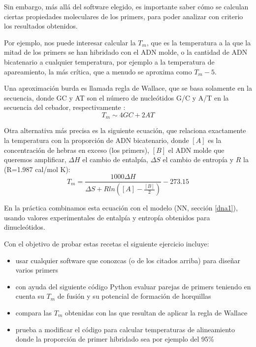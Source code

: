 Sin embargo, m\'{a}s all\'{a} del software elegido, es importante saber c\'{o}mo se calculan ciertas propiedades moleculares de los primers,
para poder analizar con criterio los resultados obtenidos. 

Por ejemplo, nos puede interesar calcular la $T_{m}$, 
que es la temperatura a la que la mitad de los primers se han hibridado con el ADN molde, 
o la cantidad de ADN bicatenario a cualquier temperatura, por ejemplo a la temperatura de apareamiento, 
la m\'{a}s cr\'{i}tica, que a menudo se aproxima como $T_{m} - 5$.

Una aproximaci\'{o}n burda es llamada regla de Wallace, que se basa solamente en la secuencia,
donde GC y AT son el n\'{u}mero de nucle\'{o}tidos G/C y A/T en la secuencia del cebador, respectivamente \citep{SantaLucia2007}:
\begin{equation}
T_{m} \sim 4GC + 2AT
\end{equation}

Otra alternativa m\'{a}s precisa es la siguiente ecuaci\'{o}n, 
que relaciona exactamente la temperatura con la proporci\'{o}n de ADN bicatenario,
donde $[A]$ es la concentraci\'{o}n de hebras en exceso (los primers), $[B]$ el ADN molde que queremos amplificar,
$\Delta H$ el cambio de entalp\'{i}a, $\Delta S$ el cambio de entrop\'{i}a y $R$ la 
 (R=1.987 cal/mol K):
\begin{equation}
T_{m} = \frac{1000 \Delta H}{\Delta S + Rln([A]-\frac{[B]}{2})} - 273.15
\end{equation}


En la pr\'{a}ctica combinamos esta ecuaci\'{o}n con el modelo  (NN, secci\'{o}n \ref{dna1}), 
usando valores experimentales de entalp\'{i}a y entrop\'{i}a obtenidos para dinucle\'{o}tidos.

Con el objetivo de probar estas recetas el siguiente ejercicio incluye:
\begin{itemize}
\item usar cualquier software que conozcas (o de los citados arriba) para dise\~nar varios primers
\item con ayuda del siguiente c\'{o}digo Python evaluar parejas de primers teniendo en cuenta su $T_{m}$ 
de fusi\'{o}n y su potencial de formaci\'{o}n de horquillas
\item compara las $T_{m}$ obtenidas con las que resultan de aplicar la regla de Wallace
\item prueba a modificar el c\'{o}digo para calcular temperaturas de alineamiento donde la proporci\'{o}n
de primer hibridado sea por ejemplo del 95\%

\end{itemize}
